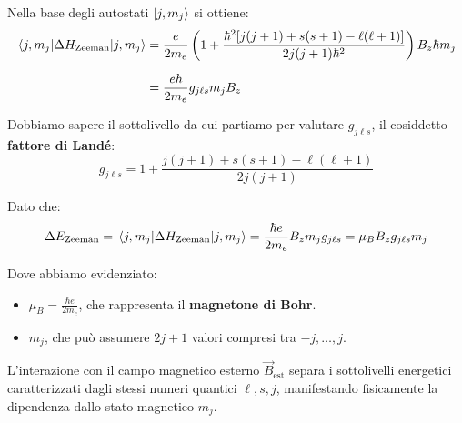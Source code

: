 Nella base degli autostati \( \ket{j, m_j} \) si ottiene:
\begin{align}
    \mel{j, m_j}{\Delta H_{\text{Zeeman}}}{j, m_j} &= \frac{e}{2m_e} \left( 1 + \frac{\hbar^2 [j(j+1) + s(s+1) - \ell(\ell+1)]}{2j(j+1)\hbar^2} \right) B_z \hbar m_j \nonumber \\[1.5ex]
    &= \frac{e\hbar}{2m_e} g_{j\ell s} m_j B_z
\end{align}

Dobbiamo sapere il sottolivello da cui partiamo per valutare \( g_{j\ell s} \), il cosiddetto \textbf{fattore di Landé}:
\begin{equation}
    g_{j\ell s} = 1 + \frac{j(j+1) + s(s+1) - \ell(\ell+1)}{2j(j+1)}
\end{equation}

Dato che:
\begin{equation}
    \Delta E_{\text{Zeeman}} = \mel{j, m_j}{\Delta H_{\text{Zeeman}}}{j, m_j} = \frac{\hbar e}{2m_e} B_z m_j g_{j\ell s} = \mu_B B_z g_{j\ell s} m_j
\end{equation}

Dove abbiamo evidenziato:
\begin{itemize}
    \item \( \mu_B = \frac{\hbar e}{2m_e} \), che rappresenta il \textbf{magnetone di Bohr}.
    \item \( m_j \), che può assumere \( 2j+1 \) valori compresi tra \( -j, \dots, j \).
\end{itemize}

L'interazione con il campo magnetico esterno \( \vec{B}_{\text{est}} \) separa i sottolivelli energetici caratterizzati dagli stessi numeri quantici \( \ell, s, j \), manifestando fisicamente la dipendenza dallo stato magnetico \( m_j \).

